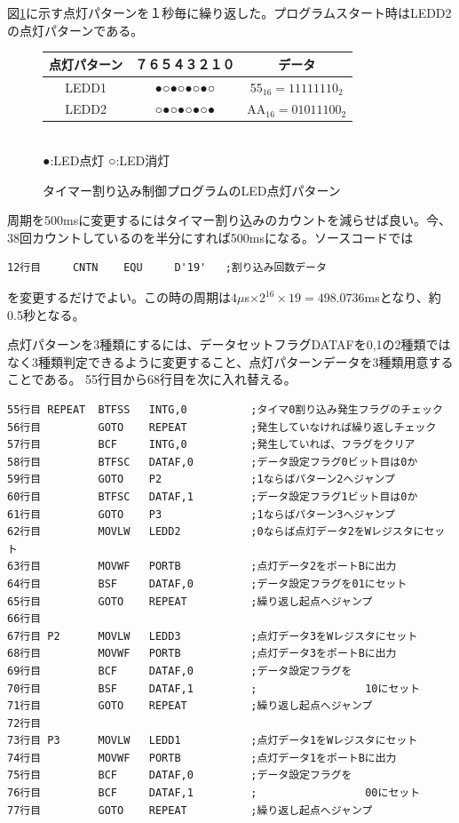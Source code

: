 \documentclass[a4paper,12pt]{ujarticle}
\begin{document}
  図\ref{fig:timer-int-led}に示す点灯パターンを１秒毎に繰り返した。プログラムスタート時はLEDD2の点灯パターンである。

  \begin{figure}[htbp]
    \begin{center}
       \begin{tabular}{c|c|c}\hline
点灯パターン&７６５４３２１０ & データ \\ \hline
      LEDD1 &●○●○●○●○ & 55$_{16}=11111110_2$ \\
      LEDD2 &○●○●○●○● & AA$_{16}=01011100_2$\\ \hline
       \end{tabular}\\
      ●:LED点灯 ○:LED消灯
    \end{center}
   \caption{タイマー割り込み制御プログラムのLED点灯パターン}
   \label{fig:timer-int-led}
  \end{figure}


  周期を500msに変更するにはタイマー割り込みのカウントを減らせば良い。今、38回カウントしているのを半分にすれば500msになる。ソースコードでは
      \begin{lstlisting}[basicstyle=\ttfamily\footnotesize, frame=single]
12行目     CNTN    EQU     D'19'   ;割り込み回数データ
      \end{lstlisting}
      を変更するだけでよい。この時の周期は$4\mu$s$\times 2^{16}\times 19=498.0736$msとなり、約0.5秒となる。

      点灯パターンを3種類にするには、データセットフラグDATAFを0,1の2種類ではなく3種類判定できるように変更すること、点灯パターンデータを3種類用意することである。
55行目から68行目を次に入れ替える。
      \begin{lstlisting}[basicstyle=\ttfamily\footnotesize, frame=single]
55行目 REPEAT  BTFSS   INTG,0          ;タイマ0割り込み発生フラグのチェック
56行目         GOTO    REPEAT          ;発生していなければ繰り返しチェック
57行目         BCF     INTG,0          ;発生していれば、フラグをクリア
58行目         BTFSC   DATAF,0         ;データ設定フラグ0ビット目は0か
59行目         GOTO    P2              ;1ならばパターン2へジャンプ
60行目         BTFSC   DATAF,1         ;データ設定フラグ1ビット目は0か
61行目         GOTO    P3              ;1ならばパターン3へジャンプ
62行目         MOVLW   LEDD2           ;0ならば点灯データ2をWレジスタにセット
63行目         MOVWF   PORTB           ;点灯データ2をポートBに出力
64行目         BSF     DATAF,0         ;データ設定フラグを01にセット
65行目         GOTO    REPEAT          ;繰り返し起点へジャンプ
66行目
67行目 P2      MOVLW   LEDD3           ;点灯データ3をWレジスタにセット
68行目         MOVWF   PORTB           ;点灯データ3をポートBに出力
69行目         BCF     DATAF,0         ;データ設定フラグを
70行目         BSF     DATAF,1         ;                 10にセット
71行目         GOTO    REPEAT          ;繰り返し起点へジャンプ
72行目
73行目 P3      MOVLW   LEDD1           ;点灯データ1をWレジスタにセット
74行目         MOVWF   PORTB           ;点灯データ1をポートBに出力
75行目         BCF     DATAF,0         ;データ設定フラグを
76行目         BCF     DATAF,1         ;                 00にセット
77行目         GOTO    REPEAT          ;繰り返し起点へジャンプ
      \end{lstlisting}
\end{document}
